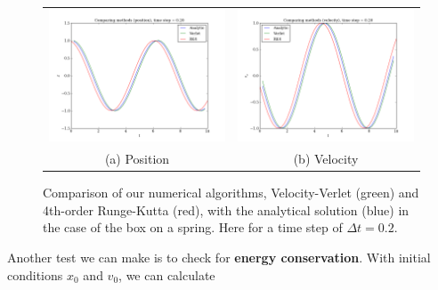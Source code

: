 \documentclass{article}
\begin{document}
\begin{multicols}{2}
\begin{figure}[t!]
\begin{center}
\begin{tabular}{cc}
  	\includegraphics[width=90mm]{Images/comparison_x.png}
	& \includegraphics[width=90mm]{Images/comparison_v.png} \\
	(a) Position				& (b) Velocity  \\[6pt]
\end{tabular}
\caption{Comparison of our numerical algorithms, Velocity-Verlet (green) and 4th-order Runge-Kutta (red), with the analytical solution (blue) in the case of the box on a spring. Here for a time step of $\Delta t = 0.2$.}\label{fig:analytical}
\end{center}
\end{figure}

\noindent Another test we can make is to check for \textbf{energy conservation}. With initial conditions $x_0$ and $v_0$, we can calculate


\end{multicols}
\end{document}
